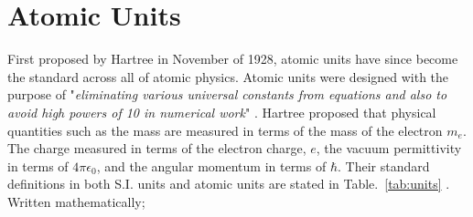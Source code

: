    \section{Atomic Units} \label{sec:atomic_units}    
        First proposed by Hartree in November of 1928, atomic units have since become the standard across all of atomic physics. Atomic units were designed with the purpose of "\textit{eliminating various universal constants from equations and also to avoid high powers of 10 in numerical work}" \cite{atomic_units_definition}. Hartree proposed that physical quantities such as the mass are measured in terms of the mass of the electron $m_e$. The charge measured in terms of the electron charge, $e$, the vacuum permittivity in terms of $4\pi \epsilon_0$, and the angular momentum in terms of $\hbar$. Their standard definitions in both S.I. units and atomic units are stated in Table.~\ref{tab:units} \cite{electron_mass_value, electron_charge_value, fine_structure_value, hbar_value, speed_of_light_value, electric_permittivity_value}. Written mathematically;
%
        \begin{table}[b]
            \centering 
            \caption{Table of fundamental constants expressed in S.I. units and atomic units.}\label{tab:units}
        \end{table}
